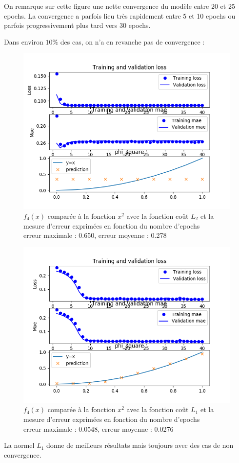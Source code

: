 \documentclass[a4paper,11pt,twoside]{report}
\begin{document}
	On remarque sur cette figure une nette convergence du modèle entre 20 et 25 epochs. La convergence a parfois lieu très rapidement entre 5 et 10 epochs ou parfois progressivement plus tard vers 30 epochs.
	
	Dans environ $10\%$ des cas, on n'a en revanche pas de convergence :
	
	\begin{figure}[H]
		\begin{center}
			\includegraphics[width=0.7\linewidth]{Figure_4.png}
			\caption{$f_4(x)$ comparée à la fonction $x^2$  avec la fonction coût $L_2$ et la mesure d'erreur exprimées en fonction du nombre d'epochs\\erreur maximale : 0.650, erreur moyenne : 0.278}
		\end{center}
	\end{figure}


	\begin{figure}[H]
		\begin{center}
			\includegraphics[width=0.7\linewidth]{Figure_6.png}
			\caption{$f_4(x)$ comparée à la fonction $x^2$  avec la fonction coût $L_1$ et la mesure d'erreur exprimées en fonction du nombre d'epochs\\erreur maximale : 0.0548, erreur moyenne : 0.0276}
		\end{center}
	\end{figure}
	La normel $L_1$ donne de meilleurs résultats mais toujours avec des cas de non convergence.
\end{document}
